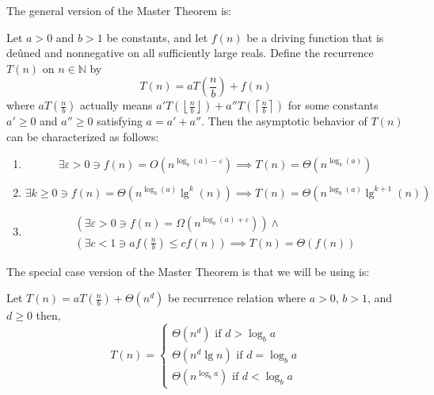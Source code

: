 \documentclass[a4paper]{exam}
\theoremstyle{mytheoremstyle}
\theoremstyle{mytheoremstyle}
\theoremstyle{myproblemstyle}
\begin{document}
\begin{questions}
	\begin{solution}
		The general version of the Master Theorem is:
		\begin{theorem}
			Let \(a>0\) and \(b>1\) be constants, and let \(f(n)\) be a driving function that is deûned and nonnegative on all sufficiently large reals. Define the recurrence \(T(n)\) on \(n\in\mathbb{N}\) by
			\[
				T(n) = aT\left(\frac{n}{b}\right)+f(n)
			\]
			where \(\displaystyle aT\left(\frac{n}{b}\right)\) actually means \(\displaystyle a'T\left(\left\lfloor\frac{n}{b}\right\rfloor\right)+a''T\left(\left\lceil\frac{n}{b}\right\rceil\right)\) for some constants \(a' \geq 0\) and \(a'' \geq 0\) satisfying \(a = a' + a''\). Then the asymptotic behavior of \(T(n)\) can be characterized as follows:
			\begin{enumerate}
				\item \[\exists \varepsilon > 0 \ni f(n) = O\left(n^{\log_b{(a)}-\varepsilon}\right)\implies T(n)=\Theta\left(n^{\log_b{(a)}}\right)\]
				\item \[\exists k \geq 0 \ni f(n) = \Theta\left(n^{\log_b{(a)}}\lg^k(n)\right) \implies T(n)=\Theta\left(n^{\log_b{(a)}}\lg^{k+1}(n)\right)\]
				\item \begin{multline*}
					      \left(\exists \varepsilon > 0 \ni f(n) = \Omega\left(n^{\log_b{(a)}+\varepsilon}\right)\right)\land \\
					      \left( \exists c<1\ni af\left(\frac{n}{b}\right) \leq cf(n) \right) \implies T(n)=\Theta\left(f(n)\right)
				      \end{multline*}
			\end{enumerate}
		\end{theorem}
		The special case version of the Master Theorem is that we will be using is:
		\begin{theorem}
			Let $T(n) = aT\left(\frac{n}{b}\right) + \Theta(n^d)$ be recurrence relation where $a > 0$, $b > 1$, and $d \geq 0$ then,
			$$T(n) = \begin{cases}
					\Theta(n^d) \text{ if } d > \log_ba\\
					\Theta(n^d \lg n) \text{ if } d = \log_ba\\
					\Theta(n^{\log_ba}) \text{ if } d < \log_ba
			\end{cases}$$


\end{theorem}
\end{solution}
\end{questions}
\end{document}
